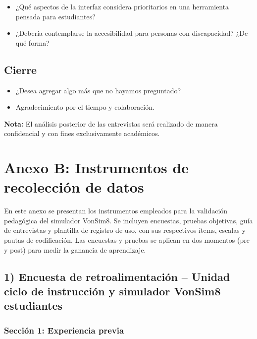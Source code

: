 \documentclass[12pt,oneside]{templates/unerthesis}
\providecommand{\tightlist}{%
  \setlength{\itemsep}{0pt}\setlength{\parskip}{0pt}}
\begin{document}
\begin{itemize}
\tightlist
\item
  ¿Qué aspectos de la interfaz considera prioritarios en una herramienta pensada para estudiantes?
\item
  ¿Debería contemplarse la accesibilidad para personas con discapacidad? ¿De qué forma?
\end{itemize}

\hypertarget{cierre}{%
\subsection{Cierre}\label{cierre}}

\begin{itemize}
\tightlist
\item
  ¿Desea agregar algo más que no hayamos preguntado?
\item
  Agradecimiento por el tiempo y colaboración.
\end{itemize}

\textbf{Nota:} El análisis posterior de las entrevistas será realizado de manera confidencial y con fines exclusivamente académicos.

\hypertarget{anexoB}{%
\section{Anexo B: Instrumentos de recolección de datos}\label{anexoB}}

En este anexo se presentan los instrumentos empleados para la validación pedagógica del simulador VonSim8. Se incluyen encuestas, pruebas objetivas, guía de entrevistas y plantilla de registro de uso, con sus respectivos ítems, escalas y pautas de codificación. Las encuestas y pruebas se aplican en dos momentos (pre y post) para medir la ganancia de aprendizaje.

\hypertarget{encuesta-de-retroalimentaciuxf3n-unidad-ciclo-de-instrucciuxf3n-y-simulador-vonsim8-estudiantes}{%
\subsection{1) Encuesta de retroalimentación -- Unidad ciclo de instrucción y simulador VonSim8 estudiantes}\label{encuesta-de-retroalimentaciuxf3n-unidad-ciclo-de-instrucciuxf3n-y-simulador-vonsim8-estudiantes}}

\hypertarget{secciuxf3n-1-experiencia-previa}{%
\subsubsection{Sección 1: Experiencia previa}\label{secciuxf3n-1-experiencia-previa}}
\end{document}
